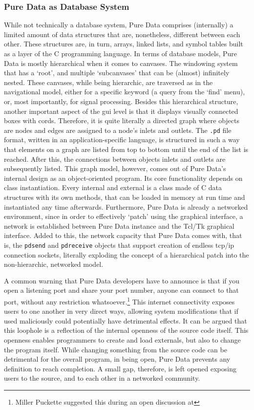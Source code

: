 \subsubsection{Pure Data as Database System}
\label{model:puredata}

While not technically a database system, Pure Data comprises (internally) a limited amount of data structures that are, nonetheless, different between each other. These structures are, in turn, arrays, linked lists, and symbol tables built as a layer of the C programming language. In terms of database models, Pure Data is mostly hierarchical when it comes to canvases. The windowing system that has a `root', and multiple `subcanvases' that can be (almost) infinitely nested. These canvases, while being hierarchic, are traversed as in the navigational model, either for a specific keyword (a query from the `find' menu), or, most importantly, for signal processing. Besides this hierarchical structure, another important aspect of the \gls{gui} level is that it displays visually connected boxes with cords. Therefore, it is quite literally a directed graph where objects are nodes and edges are assigned to a node's inlets and outlets. The \texttt{.pd} file format, written in an application-specific language, is structured in such a way that elements on a graph are listed from top to bottom until the end of the list is reached. After this, the connections between objects inlets and outlets are subsequently listed. This graph model, however, comes out of Pure Data's internal design as an object-oriented program. Its core functionality depends on class instantiation. Every internal and external is a class made of C data structures with its own methods, that can be loaded in memory at run time and instantiated any time afterwards. Furthermore, Pure Data is already a networked environment, since in order to effectively `patch' using the graphical interface, a network is established between Pure Data instance and the Tcl/Tk graphical interface. Added to this, the network capacity that Pure Data comes with, that is, the \texttt{pdsend} and \texttt{pdreceive} objects that support creation of endless \gls{tcp/ip} connection sockets, literally exploding the concept of a hierarchical patch into the non-hierarchic, networked model. 

A common warning that Pure Data developers have to announce is that if you open a listening port and share your port number, anyone can connect to that port, without any restriction whatsoever.\footnote{Miller Puckette suggested this during an open discussion at } This internet connectivity exposes users to one another in very direct ways, allowing system modifications that if used maliciously could potentially have detrimental effects. It can be argued that this loophole is a reflection of the internal openness of the source code itself. This openness enables programmers to create and load externals, but also to change the program itself. While changing something from the source code can be detrimental for the overall program, in being open, Pure Data prevents any definition to reach completion. A small gap, therefore, is left opened exposing users to the source, and to each other in a networked community.

